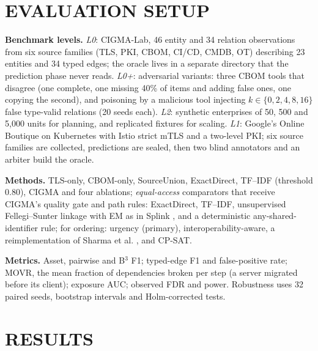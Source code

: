 \documentclass[a4paper,twoside]{article}
\newcommand{\cigma}{CIGMA\xspace}
\begin{document}
\section{\uppercase{Evaluation Setup}}
\label{sec:setup}

\textbf{Benchmark levels.} \emph{L0}: CIGMA-Lab, 46 entity and 34 relation observations from six source families (TLS, PKI, CBOM, CI/CD, CMDB, OT) describing 23 entities and 34 typed edges; the oracle lives in a separate directory that the prediction phase never reads. \emph{L0+}: adversarial variants: three CBOM tools that disagree (one complete, one missing 40\% of items and adding false ones, one copying the second), and poisoning by a malicious tool injecting $k\in\{0,2,4,8,16\}$ false type-valid relations (20 seeds each). \emph{L2}: synthetic enterprises of 50, 500 and 5{,}000 units for planning, and replicated fixtures for scaling. \emph{L1}: Google's Online Boutique \cite{googleob} on Kubernetes with Istio strict mTLS and a two-level PKI; six source families are collected, predictions are sealed, then two blind annotators and an arbiter build the oracle.

\textbf{Methods.} TLS-only, CBOM-only, SourceUnion, ExactDirect, TF--IDF (threshold 0.80), \cigma and four ablations; \emph{equal-access} comparators that receive \cigma's quality gate and path rules: ExactDirect, TF--IDF, unsupervised Fellegi--Sunter linkage with EM as in Splink \cite{fellegi1969theory,linacre2022splink}, and a deterministic any-shared-identifier rule; for ordering: urgency (primary), interoperability-aware, a reimplementation of Sharma et al. \cite{sharma2026dependency}, and CP-SAT.

\textbf{Metrics.} Asset, pairwise and B$^3$ F1; typed-edge F1 and false-positive rate; MOVR, the mean fraction of dependencies broken per step (a server migrated before its client); exposure AUC; observed FDR and power. Robustness uses 32 paired seeds, bootstrap intervals and Holm-corrected tests.

\section{\uppercase{Results}}
\label{sec:results}
\end{document}
